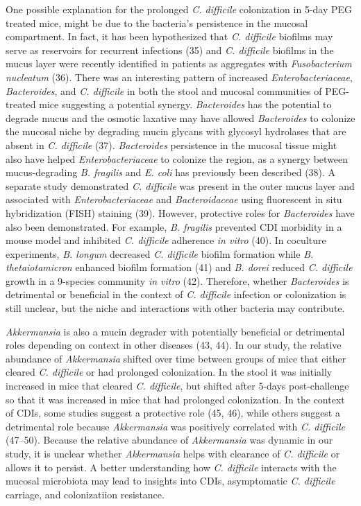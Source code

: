 \documentclass[
  11pt,
]{article}
\begin{document}
One possible explanation for the prolonged \emph{C. difficile}
colonization in 5-day PEG treated mice, might be due to the bacteria's
persistence in the mucosal compartment. In fact, it has been
hypothesized that \emph{C. difficile} biofilms may serve as reservoirs
for recurrent infections (35) and \emph{C. difficile} biofilms in the
mucus layer were recently identified in patients as aggregates with
\emph{Fusobacterium nucleatum} (36). There was an interesting pattern of
increased \emph{Enterobacteriaceae}, \emph{Bacteroides}, and \emph{C.
difficile} in both the stool and mucosal communities of PEG-treated mice
suggesting a potential synergy. \emph{Bacteroides} has the potential to
degrade mucus and the osmotic laxative may have allowed
\emph{Bacteroides} to colonize the mucosal niche by degrading mucin
glycans with glycosyl hydrolases that are absent in \emph{C. difficile}
(37). \emph{Bacteroides} persistence in the mucosal tissue might also
have helped \emph{Enterobacteriaceae} to colonize the region, as a
synergy between mucus-degrading \emph{B. fragilis} and \emph{E. coli}
has previously been described (38). A separate study demonstrated
\emph{C. difficile} was present in the outer mucus layer and associated
with \emph{Enterobacteriaceae} and \emph{Bacteroidaceae} using
fluorescent in situ hybridization (FISH) staining (39). However,
protective roles for \emph{Bacteroides} have also been demonstrated. For
example, \emph{B. fragilis} prevented CDI morbidity in a mouse model and
inhibited \emph{C. difficile} adherence \emph{in vitro} (40). In
coculture experiments, \emph{B. longum} decreased \emph{C. difficile}
biofilm formation while \emph{B. thetaiotamicron} enhanced biofilm
formation (41) and \emph{B. dorei} reduced \emph{C. difficile} growth in
a 9-species community \emph{in vitro} (42). Therefore, whether
\emph{Bacteroides} is detrimental or beneficial in the context of
\emph{C. difficile} infection or colonization is still unclear, but the
niche and interactions with other bacteria may contribute.

\emph{Akkermansia} is also a mucin degrader with potentially beneficial
or detrimental roles depending on context in other diseases (43, 44). In
our study, the relative abundance of \emph{Akkermansia} shifted over
time between groups of mice that either cleared \emph{C. difficile} or
had prolonged colonization. In the stool it was initially increased in
mice that cleared \emph{C. difficile}, but shifted after 5-days
post-challenge so that it was increased in mice that had prolonged
colonization. In the context of CDIs, some studies suggest a protective
role (45, 46), while others suggest a detrimental role because
\emph{Akkermansia} was positively correlated with \emph{C. difficile}
(47--50). Because the relative abundance of \emph{Akkermansia} was
dynamic in our study, it is unclear whether \emph{Akkermansia} helps
with clearance of \emph{C. difficile} or allows it to persist. A better
understanding how \emph{C. difficile} interacts with the mucosal
microbiota may lead to insights into CDIs, asymptomatic \emph{C.
difficile} carriage, and colonizatiion resistance.
\end{document}

